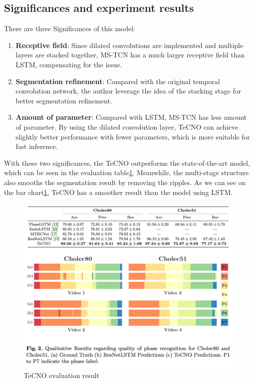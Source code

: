 \documentclass[11pt]{article} \usepackage[top=1in, bottom=1in, left=1in, right=1in]{geometry}
\begin{document}
\subsection{Significances and experiment results}
There are three Significances of this model:
\begin{enumerate}
  \item \textbf{Receptive field}: Since dilated convolutions are implemented and multiple layers are stacked together, MS-TCN has a much larger receptive field than LSTM, compensating for the issue. 
  \item \textbf{Segmentation refinement}: Compared with the original temporal convolution network, the author leverage the idea of the stacking stage for better segmentation refinement.
  \item \textbf{Amount of parameter}: Compared with LSTM, MS-TCN has less amount of parameter. By using the dilated convolution layer, TeCNO can achieve slightly better performance with fewer parameters, which is more suitable for fast inference. 
\end{enumerate}
With these two significances, the TeCNO outperforms the state-of-the-art model, which can be seen in the evaluation table\ref{fig:tecno_res}. Meanwhile, the multi-stage structure also smooths the segmentation result by removing the ripples. As we can see on the bar chart\ref{fig:tecno_res}, TeCNO has a smoother result than the model using LSTM.

\begin{figure}[H]
  \includegraphics[scale = 0.8]{TeCNO_res.png}
  \centering
  \caption{ TeCNO evaluation result \cite{TeCNO}}
  \label{fig:tecno_res}
\end{figure}
\end{document}
